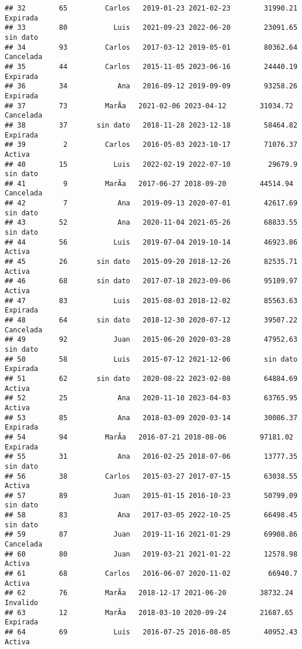 \documentclass[
]{article}
\begin{document}
\begin{verbatim}
## 32        65         Carlos   2019-01-23 2021-02-23        31990.21  Expirada
## 33        80           Luis   2021-09-23 2022-06-20        23091.65  sin dato
## 34        93         Carlos   2017-03-12 2019-05-01        80362.64 Cancelada
## 35        44         Carlos   2015-11-05 2023-06-16        24440.19  Expirada
## 36        34            Ana   2016-09-12 2019-09-09        93258.26  Expirada
## 37        73         MarÃ­a   2021-02-06 2023-04-12        31034.72 Cancelada
## 38        37       sin dato   2018-11-28 2023-12-18        58464.82  Expirada
## 39         2         Carlos   2016-05-03 2023-10-17        71076.37    Activa
## 40        15           Luis   2022-02-19 2022-07-10         29679.9  sin dato
## 41         9         MarÃ­a   2017-06-27 2018-09-20        44514.94 Cancelada
## 42         7            Ana   2019-09-13 2020-07-01        42617.69  sin dato
## 43        52            Ana   2020-11-04 2021-05-26        68833.55  sin dato
## 44        56           Luis   2019-07-04 2019-10-14        46923.86    Activa
## 45        26       sin dato   2015-09-20 2018-12-26        82535.71    Activa
## 46        68       sin dato   2017-07-18 2023-09-06        95109.97    Activa
## 47        83           Luis   2015-08-03 2018-12-02        85563.63  Expirada
## 48        64       sin dato   2018-12-30 2020-07-12        39507.22 Cancelada
## 49        92           Juan   2015-06-20 2020-03-28        47952.63  sin dato
## 50        58           Luis   2015-07-12 2021-12-06        sin dato  Expirada
## 51        62       sin dato   2020-08-22 2023-02-08        64884.69    Activa
## 52        25            Ana   2020-11-10 2023-04-03        63765.95    Activa
## 53        85            Ana   2018-03-09 2020-03-14        30086.37  Expirada
## 54        94         MarÃ­a   2016-07-21 2018-08-06        97181.02  Expirada
## 55        31            Ana   2016-02-25 2018-07-06        13777.35  sin dato
## 56        38         Carlos   2015-03-27 2017-07-15        63038.55    Activa
## 57        89           Juan   2015-01-15 2016-10-23        50799.09  sin dato
## 58        83            Ana   2017-03-05 2022-10-25        66498.45  sin dato
## 59        87           Juan   2019-11-16 2021-01-29        69908.86 Cancelada
## 60        80           Juan   2019-03-21 2021-01-22        12578.98    Activa
## 61        68         Carlos   2016-06-07 2020-11-02         66940.7    Activa
## 62        76         MarÃ­a   2018-12-17 2021-06-20        38732.24  Invalido
## 63        12         MarÃ­a   2018-03-10 2020-09-24        21687.65  Expirada
## 64        69           Luis   2016-07-25 2016-08-05        40952.43    Activa

\end{verbatim}
\end{document}
